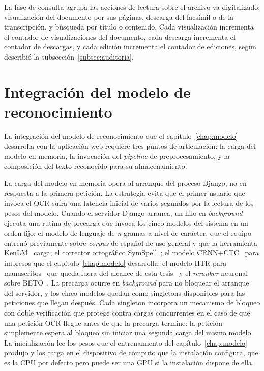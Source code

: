 La fase de consulta agrupa las acciones de lectura sobre el archivo ya digitalizado: visualización del documento por sus páginas, descarga del facsímil o de la transcripción, y búsqueda por título o contenido. Cada visualización incrementa el contador de visualizaciones del documento, cada descarga incrementa el contador de descargas, y cada edición incrementa el contador de ediciones, según describió la subsección~\ref{subsec:auditoria}.

\section{Integración del modelo de reconocimiento}
\label{sec:integracion-ocr}

La integración del modelo de reconocimiento que el capítulo~\ref{chap:modelo} desarrolla con la aplicación web requiere tres puntos de articulación: la carga del modelo en memoria, la invocación del \textit{pipeline} de preprocesamiento, y la composición del texto reconocido para su almacenamiento.

La carga del modelo en memoria opera al arranque del proceso Django, no en respuesta a la primera petición. La estrategia evita que el primer usuario que invoca el OCR sufra una latencia inicial de varios segundos por la lectura de los pesos del modelo. Cuando el servidor Django arranca, un hilo en \textit{background} ejecuta una rutina de precarga que invoca los cinco modelos del sistema en un orden fijo: el modelo de lenguaje de \textit{n}-gramas a nivel de carácter, que el equipo entrenó previamente sobre \textit{corpus} de español de uso general y que la herramienta KenLM~\cite{heafield2011kenlm} carga; el corrector ortográfico SymSpell~\cite{garbe2012symspell}; el modelo CRNN+CTC~\cite{shi2016crnn,graves2006ctc} para impresos que el capítulo~\ref{chap:modelo} desarrolla; el modelo HTR para manuscritos --que queda fuera del alcance de esta tesis-- y el \textit{reranker} neuronal sobre BETO~\cite{canete2020beto}. La precarga ocurre en \textit{background} para no bloquear el arranque del servidor, y los cinco modelos quedan como singletons disponibles para las peticiones que llegan después. Cada singleton incorpora un mecanismo de bloqueo con doble verificación que protege contra cargas concurrentes en el caso de que una petición OCR llegue antes de que la precarga termine: la petición simplemente espera al bloqueo sin iniciar una segunda carga del mismo modelo. La inicialización lee los pesos que el entrenamiento del capítulo~\ref{chap:modelo} produjo y los carga en el dispositivo de cómputo que la instalación configura, que es la CPU por defecto pero puede ser una GPU si la instalación dispone de ella.

